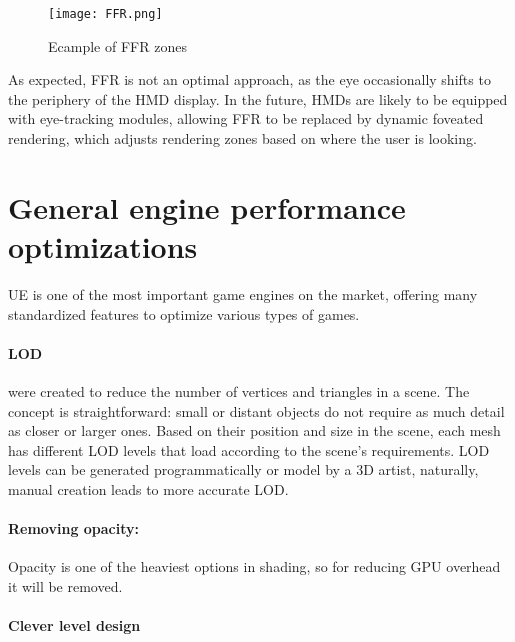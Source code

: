\begin{figure}[ht]
  \texttt{[image: FFR.png]}
  \caption{Ecample of FFR zones}
  \label{fig:FFR}
\end{figure}

\noindent
As expected, \ac{FFR} is not an optimal approach, as the eye occasionally shifts to the periphery of the \ac{HMD} display.
In the future, \ac{HMD}s are likely to be equipped with eye-tracking modules, allowing \ac{FFR} to be replaced by dynamic foveated rendering, which adjusts rendering zones based on where the user is looking.

\section{General engine performance optimizations}
\noindent
\ac{UE} is one of the most important game engines on the market, offering many standardized features to optimize various types of games.

\paragraph{\ac{LOD}}
were created to reduce the number of vertices and triangles in a scene.
The concept is straightforward: small or distant objects do not require as much detail as closer or larger ones. 
Based on their position and size in the scene, each mesh has different \ac{LOD} levels that load according to the scene's requirements.
\ac{LOD} levels can be generated programmatically or model by a 3D artist, naturally, manual creation leads to more accurate \ac{LOD}.

\paragraph{Removing opacity:}
Opacity is one of the heaviest options in shading, so for reducing GPU overhead it will be removed.

\paragraph{Clever level design}
